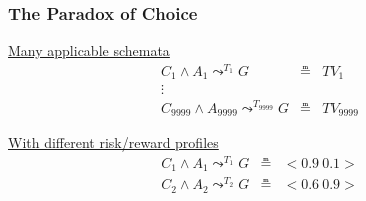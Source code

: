 \documentclass[aspectratio=169]{beamer}
\newcommand{\lpreimp}[1]{\leadsto^{#1}}
\begin{document}
\begin{frame}
  \frametitle{The Paradox of Choice}



  \alert{\underline{Many applicable schemata}}\\
  $$
  \begin{array}{ccc}
    C_1 \land A_1 \lpreimp{T_1} G & \measeq & \textit{TV}_1\\
    \vdots & & \\
    C_{9999} \land A_{9999} \lpreimp{T_{9999}} G & \measeq & \textit{TV}_{9999}
  \end{array}
  $$

  \pause


  \alert{\underline{With different risk/reward profiles}}\\

  $$
  \begin{array}{ccc}
    C_1 \land A_1 \lpreimp{T_1} G & \measeq & <\!0.9\ 0.1\!>\\
    C_2 \land A_2 \lpreimp{T_2} G & \measeq & <\!0.6\ 0.9\!>
  \end{array}
  $$

  \pause



\end{frame}
\end{document}
